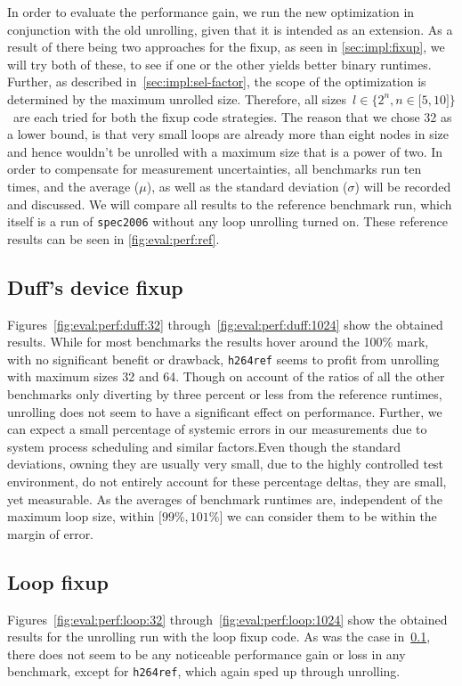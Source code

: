In order to evaluate the performance gain, we run the new optimization in conjunction with the old unrolling, given that it is intended as an extension.
As a result of there being two approaches for the fixup, as seen in \cref{sec:impl:fixup}, we will try both of these, to see if one or the other yields better binary runtimes.
Further, as described in~\cref{sec:impl:sel-factor}, the scope of the optimization is determined by the maximum unrolled size.
Therefore, all sizes~$l \in \{2^n, n \in \lbrack 5, 10 \rbrack \}$~are each tried for both the fixup code strategies.
The reason that we chose 32 as a lower bound, is that very small loops are already more than eight nodes in size and hence wouldn't be unrolled with a maximum size that is a power of two.
In order to compensate for measurement uncertainties, all benchmarks run ten times, and the average ($\mu$), as well as the standard deviation ($\sigma$) will be recorded and discussed.
We will compare all results to the reference benchmark run, which itself is a run of \texttt{spec2006} without any loop unrolling turned on.
These reference results can be seen in \cref{fig:eval:perf:ref}.



\subsection{Duff's device fixup}\label{sec:eval:perf:duff}



Figures~\ref{fig:eval:perf:duff:32} through~\ref{fig:eval:perf:duff:1024} show the obtained results.
While for most benchmarks the results hover around the 100\% mark, with no significant benefit or drawback, \texttt{h264ref} seems to profit from unrolling with maximum sizes 32 and 64.
Though on account of the ratios of all the other benchmarks only diverting by three percent or less from the reference runtimes, unrolling does not seem to have a significant effect on performance.
Further, we can expect a small percentage of systemic errors in our measurements due to system process scheduling and similar factors.Even though the standard deviations, owning they are usually very small, due to the highly controlled test environment, do not entirely account for these percentage deltas, they are small, yet measurable.
As the averages of benchmark runtimes are, independent of the maximum loop size, within $\lbrack 99\%, 101\% \rbrack$ we can consider them to be within the margin of error.

\subsection{Loop fixup}\label{sec:eval:perf:loop}



Figures~\ref{fig:eval:perf:loop:32} through~\ref{fig:eval:perf:loop:1024} show the obtained results for the unrolling run with the loop fixup code.
As was the case in~\cref{sec:eval:perf:duff}, there does not seem to be any noticeable performance gain or loss in any benchmark, except for \texttt{h264ref}, which again sped up through unrolling.
